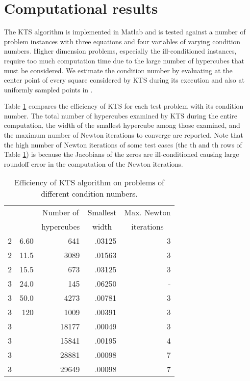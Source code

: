 \documentclass{article}
\begin{document}
\section{Computational results}
\label{section_comp}
The KTS algorithm is implemented in Matlab and is tested against a
number of problem instances with three equations and four variables of varying condition numbers.  Higher dimension problems, especially the ill-conditioned instances, require too much computation time due to the large number of hypercubes that must be considered.  We estimate the condition number by evaluating  at the center point  of every square considered by KTS during its execution and also at uniformly sampled points in .  

Table \ref{table_res} compares the efficiency of KTS for each test
problem with its condition number.  The total number of hypercubes
examined by KTS during the entire computation, the width of the
smallest hypercube among those examined, and the maximum number of
Newton iterations to converge are reported.  Note that the high
number of Newton iterations of some test cases (the th and th rows of Table \ref{table_res}) is because the Jacobians of the zeros are ill-conditioned causing large roundoff error in the computation of the Newton iterations.


\begin{table}
\begin{center}
\begin{tabular}{|r|r|r|r|r|}
\hline \multirow{2}{*}{} &
\multicolumn{1}{|c|}{\multirow{2}{*}{}} & \multicolumn{1}{|c|}{Number of} & \multicolumn{1}{|c|}{Smallest} &
Max. Newton \\
& & hypercubes & \multicolumn{1}{|c|}{width} & \multicolumn{1}{|c|}{iterations} \\
\hline 2 & 6.60 & 641 & .03125 & 3 \\   2 & 11.5 & 3089 & .01563 & 3 \\ 2 & 15.5 & 673 & .03125 & 3 \\  3 & 24.0 & 145 & .06250 & - \\ 3 & 50.0 & 4273 & .00781 & 3 \\ 3 & 120 & 1009 & .00391 & 3 \\ 3 &  & 18177 & .00049 & 3 \\ 3 &  & 15841 & .00195 & 4 \\ 3 &  &  28881 & .00098 & 7 \\ 3&  & 29649 & .00098 & 7 \\ \hline
\end{tabular}
\end{center}
\caption{Efficiency of KTS algorithm on problems of different
condition numbers.\label{table_res}}
\end{table}
\end{document}
